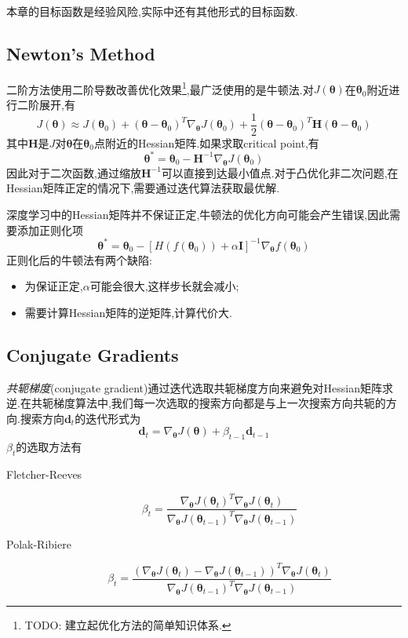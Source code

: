 本章的目标函数是经验风险,实际中还有其他形式的目标函数.

\subsection{Newton's Method}

二阶方法使用二阶导数改善优化效果\footnote{TODO: 建立起优化方法的简单知识体系.},最广泛使用的是牛顿法.对$J(\bm\theta)$在$\bm\theta_0$附近进行二阶展开,有
\begin{equation}
J(\bm\theta)\approx J(\bm\theta_0)+(\bm\theta-\bm\theta_0)^T\nabla_{\bm\theta} J(\bm\theta_0)+\frac{1}{2}(\bm\theta-\bm\theta_0)^T\bm H(\bm\theta-\bm\theta_0)
\end{equation}
其中$\bm H$是$J$对$\bm\theta$在$\bm\theta_0$点附近的Hessian矩阵.如果求取critical point,有
\begin{equation}\label{eq:newtown_cirtical_point}
\bm\theta^\ast=\bm\theta_0-\bm H^{-1}\nabla_{\bm\theta} J(\bm\theta_0)
\end{equation}
因此对于二次函数,通过缩放$\bm H^{-1}$可以直接到达最小值点.对于凸优化非二次问题,在Hessian矩阵正定的情况下,需要通过迭代算法获取最优解.

深度学习中的Hessian矩阵并不保证正定,牛顿法的优化方向可能会产生错误,因此需要添加正则化项
\begin{equation}
\bm\theta^\ast=\bm\theta_0-\left[H(f(\bm\theta_0))+\alpha\bm I\right]^{-1}\nabla_{\bm\theta} f(\bm\theta_0)
\end{equation}
正则化后的牛顿法有两个缺陷:
\begin{itemize}
    \item 为保证正定,$\alpha$可能会很大,这样步长就会减小;
    \item 需要计算Hessian矩阵的逆矩阵,计算代价大.
\end{itemize}

\subsection{Conjugate Gradients}

\textit{共轭梯度}(conjugate gradient)通过迭代选取共轭梯度方向来避免对Hessian矩阵求逆.在共轭梯度算法中,我们每一次选取的搜索方向都是与上一次搜索方向共轭的方向.搜索方向$\bm d_t$的迭代形式为
\begin{equation}
\bm d_t=\nabla_{\bm\theta} J(\bm\theta)+\beta_{t-1}\bm d_{t-1}
\end{equation}
$\beta_{t}$的选取方法有
\begin{description}
    \item [Fletcher-Reeves] \begin{equation}\beta_t=\frac{\nabla_{\bm\theta} J(\bm\theta_t)^T\nabla_{\bm\theta} J(\bm\theta_t)}{\nabla_{\bm\theta} J(\bm\theta_{t-1})^T\nabla_{\bm\theta} J(\bm\theta_{t-1})}\end{equation}
    \item [Polak-Ribiere] \begin{equation}\beta_t=\frac{(\nabla_{\bm\theta} J(\bm\theta_t)-\nabla_{\bm\theta} J(\bm\theta_{t-1}))^T\nabla_{\bm\theta} J(\bm\theta_t)}{\nabla_{\bm\theta} J(\bm\theta_{t-1})^T\nabla_{\bm\theta} J(\bm\theta_{t-1})}\end{equation}
\end{description}

